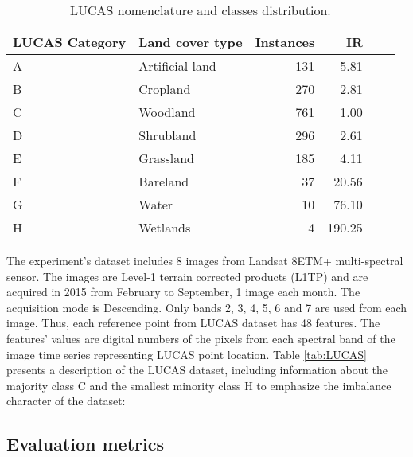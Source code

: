 \documentclass[remotesensing,article,submit,moreauthors,pdftex]{Definitions/mdpi}
\begin{document}
\begin{table}[H]
	\centering
	\begin{tabular}{llrrrr}
		\toprule
		\textbf{LUCAS Category} & \textbf{Land cover type} & \textbf{Instances}
		& \textbf{IR} \\
		\hline
		A & Artificial land & 131 & 5.81 \\
		B & Cropland        & 270 & 2.81 \\
		C & Woodland        & 761 & 1.00 \\
		D & Shrubland       & 296 & 2.61 \\
		E & Grassland       & 185 & 4.11 \\
		F & Bareland        & 37  & 20.56 \\
		G & Water           & 10  & 76.10 \\
		H & Wetlands        & 4   & 190.25\\
		\bottomrule
	\end{tabular}
	\caption{\label{tab:classes_distribution}LUCAS nomenclature and classes distribution.}
\end{table}

The experiment's dataset includes 8 images from Landsat 8ETM+ multi-spectral
sensor. The images are Level-1 terrain corrected products (L1TP) and are
acquired in 2015 from February to September, 1 image each month. The acquisition
mode is Descending. Only bands 2, 3, 4, 5, 6 and 7 are used from each image.
Thus, each reference point from LUCAS dataset has 48 features. The features'
values are digital numbers of the pixels from each spectral band of the image
time series representing LUCAS point location. Table \ref{tab:LUCAS} presents a
description of the LUCAS dataset, including information about the majority class
C and the smallest minority class H to emphasize the imbalance character of the
dataset:


\subsection{Evaluation metrics}  \label{Evaluation metrics}
\end{document}

